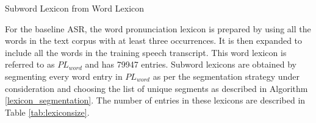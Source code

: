 \begin{algorithm}[ht]
    \caption{Subword Lexicon from Word Lexicon}\label{lexicon_segmentation}
    \begin{algorithmic}[1]
         
         
        \EndFor
         
        \State {}
        \EndProcedure
    \end{algorithmic}
\end{algorithm}

For the baseline ASR, the word pronunciation lexicon is prepared by using all
the words in the text corpus with at least three occurrences. It is then
expanded to include all the words in the training speech transcript. This word
lexicon is referred to as $PL_{word}$ and has 79947 entries. Subword lexicons
are obtained by segmenting every word entry in $PL_{word}$ as per the
segmentation strategy under consideration and choosing the list of unique
segments as described in Algorithm \ref{lexicon_segmentation}. The number of
entries in these lexicons are described in Table \ref{tab:lexiconsize}.


